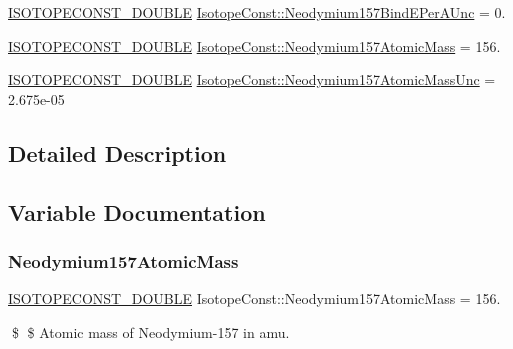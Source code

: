 \begin{DoxyCompactItemize}
\mbox{\hyperlink{group___isotope_const-_macros_ga8f45a7272ce02c0b4c65c44636ed719a}{I\+S\+O\+T\+O\+P\+E\+C\+O\+N\+S\+T\+\_\+\+D\+O\+U\+B\+LE}} \mbox{\hyperlink{group___isotope_const-_neodymium-_nd157_ga24572c82a45c2cc51a35e2015b6d88e7}{Isotope\+Const\+::\+Neodymium157\+Bind\+E\+Per\+A\+Unc}} = 0.
\item 
\mbox{\hyperlink{group___isotope_const-_macros_ga8f45a7272ce02c0b4c65c44636ed719a}{I\+S\+O\+T\+O\+P\+E\+C\+O\+N\+S\+T\+\_\+\+D\+O\+U\+B\+LE}} \mbox{\hyperlink{group___isotope_const-_neodymium-_nd157_ga84795e86d1c47b2372cee3863ca43727}{Isotope\+Const\+::\+Neodymium157\+Atomic\+Mass}} = 156.
\item 
\mbox{\hyperlink{group___isotope_const-_macros_ga8f45a7272ce02c0b4c65c44636ed719a}{I\+S\+O\+T\+O\+P\+E\+C\+O\+N\+S\+T\+\_\+\+D\+O\+U\+B\+LE}} \mbox{\hyperlink{group___isotope_const-_neodymium-_nd157_ga9ac9041d0f17e6206b965d9a51b8f561}{Isotope\+Const\+::\+Neodymium157\+Atomic\+Mass\+Unc}} = 2.\+675e-\/05
\end{DoxyCompactItemize}


\subsection{Detailed Description}


\subsection{Variable Documentation}
\mbox{\label{group___isotope_const-_neodymium-_nd157_ga84795e86d1c47b2372cee3863ca43727}} 
\subsubsection{\texorpdfstring{Neodymium157\+Atomic\+Mass}{Neodymium157AtomicMass}}
{\footnotesize\ttfamily \mbox{\hyperlink{group___isotope_const-_macros_ga8f45a7272ce02c0b4c65c44636ed719a}{I\+S\+O\+T\+O\+P\+E\+C\+O\+N\+S\+T\+\_\+\+D\+O\+U\+B\+LE}} Isotope\+Const\+::\+Neodymium157\+Atomic\+Mass = 156.}

\$ \$ Atomic mass of Neodymium-\/157 in amu. \mbox{\label{group___isotope_const-_neodymium-_nd157_ga9ac9041d0f17e6206b965d9a51b8f561}} 

